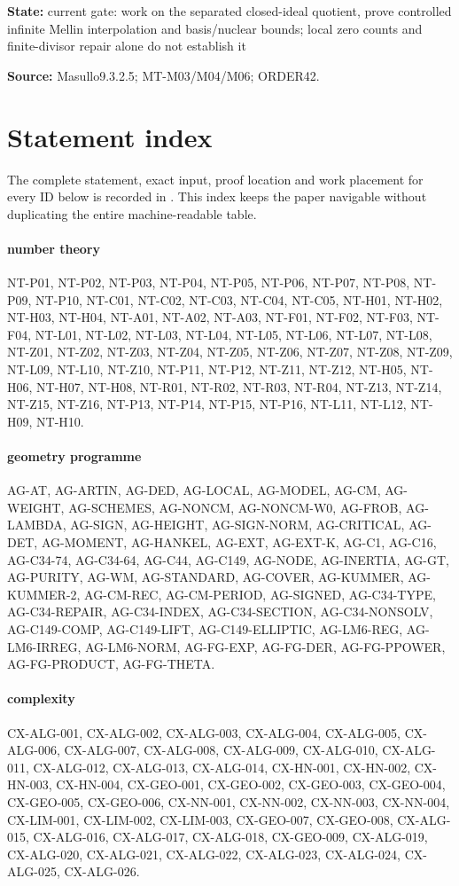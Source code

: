 \documentclass[11pt,a4paper]{article}
\begin{document}
\textbf{State:} current gate:\allowbreak{} work on the separated closed-ideal quotient, prove controlled infinite Mellin interpolation and basis/\allowbreak{}nuclear bounds; local zero counts and finite-divisor repair alone do not establish it

\textbf{Source:} Masullo9.\allowbreak{}3.\allowbreak{}2.\allowbreak{}5; MT-M03/\allowbreak{}M04/\allowbreak{}M06; ORDER42.
\section*{Statement index}
The complete statement, exact input, proof location and work placement for
every ID below is recorded in . This index keeps
the paper navigable without duplicating the entire machine-readable table.
\paragraph{number theory} NT-P01, NT-P02, NT-P03, NT-P04, NT-P05, NT-P06, NT-P07, NT-P08, NT-P09, NT-P10, NT-C01, NT-C02, NT-C03, NT-C04, NT-C05, NT-H01, NT-H02, NT-H03, NT-H04, NT-A01, NT-A02, NT-A03, NT-F01, NT-F02, NT-F03, NT-F04, NT-L01, NT-L02, NT-L03, NT-L04, NT-L05, NT-L06, NT-L07, NT-L08, NT-Z01, NT-Z02, NT-Z03, NT-Z04, NT-Z05, NT-Z06, NT-Z07, NT-Z08, NT-Z09, NT-L09, NT-L10, NT-Z10, NT-P11, NT-P12, NT-Z11, NT-Z12, NT-H05, NT-H06, NT-H07, NT-H08, NT-R01, NT-R02, NT-R03, NT-R04, NT-Z13, NT-Z14, NT-Z15, NT-Z16, NT-P13, NT-P14, NT-P15, NT-P16, NT-L11, NT-L12, NT-H09, NT-H10.
\paragraph{geometry programme} AG-AT, AG-ARTIN, AG-DED, AG-LOCAL, AG-MODEL, AG-CM, AG-WEIGHT, AG-SCHEMES, AG-NONCM, AG-NONCM-W0, AG-FROB, AG-LAMBDA, AG-SIGN, AG-HEIGHT, AG-SIGN-NORM, AG-CRITICAL, AG-DET, AG-MOMENT, AG-HANKEL, AG-EXT, AG-EXT-K, AG-C1, AG-C16, AG-C34-74, AG-C34-64, AG-C44, AG-C149, AG-NODE, AG-INERTIA, AG-GT, AG-PURITY, AG-WM, AG-STANDARD, AG-COVER, AG-KUMMER, AG-KUMMER-2, AG-CM-REC, AG-CM-PERIOD, AG-SIGNED, AG-C34-TYPE, AG-C34-REPAIR, AG-C34-INDEX, AG-C34-SECTION, AG-C34-NONSOLV, AG-C149-COMP, AG-C149-LIFT, AG-C149-ELLIPTIC, AG-LM6-REG, AG-LM6-IRREG, AG-LM6-NORM, AG-FG-EXP, AG-FG-DER, AG-FG-PPOWER, AG-FG-PRODUCT, AG-FG-THETA.
\paragraph{complexity} CX-ALG-001, CX-ALG-002, CX-ALG-003, CX-ALG-004, CX-ALG-005, CX-ALG-006, CX-ALG-007, CX-ALG-008, CX-ALG-009, CX-ALG-010, CX-ALG-011, CX-ALG-012, CX-ALG-013, CX-ALG-014, CX-HN-001, CX-HN-002, CX-HN-003, CX-HN-004, CX-GEO-001, CX-GEO-002, CX-GEO-003, CX-GEO-004, CX-GEO-005, CX-GEO-006, CX-NN-001, CX-NN-002, CX-NN-003, CX-NN-004, CX-LIM-001, CX-LIM-002, CX-LIM-003, CX-GEO-007, CX-GEO-008, CX-ALG-015, CX-ALG-016, CX-ALG-017, CX-ALG-018, CX-GEO-009, CX-ALG-019, CX-ALG-020, CX-ALG-021, CX-ALG-022, CX-ALG-023, CX-ALG-024, CX-ALG-025, CX-ALG-026.
\end{document}
